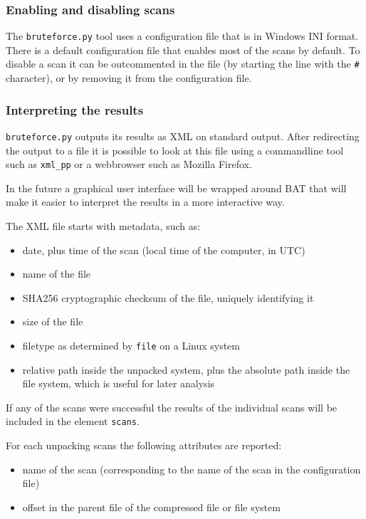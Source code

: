 \documentclass[10pt]{article}
\begin{document}
\subsubsection{Enabling and disabling scans}

The \texttt{bruteforce.py} tool uses a configuration file that is in Windows
INI format. There is a default configuration file that enables most of the
scans by default. To disable a scan it can be outcommented in the file (by
starting the line with the \texttt{\#} character), or by removing it from the
configuration file.

\subsubsection{Interpreting the results}

\texttt{bruteforce.py} outputs its results as XML on standard output. After
redirecting the output to a file it is possible to look at this file using a
commandline tool such as \texttt{xml\_pp} or a webbrowser such as Mozilla
Firefox.

In the future a graphical user interface will be wrapped around BAT that will
make it easier to interpret the results in a more interactive way.

The XML file starts with metadata, such as:

\begin{itemize}
\item date, plus time of the scan (local time of the computer, in UTC)
\item name of the file
\item SHA256 cryptographic checksum of the file, uniquely identifying it
\item size of the file
\item filetype as determined by \texttt{file} on a Linux system
\item relative path inside the unpacked system, plus the absolute path inside
the file system, which is useful for later analysis
\end{itemize}

If any of the scans were successful the results of the individual scans will
be included in the element \texttt{scans}.

For each unpacking scans the following attributes are reported:

\begin{itemize}
\item name of the scan (corresponding to the name of the scan in the
configuration file)
\item offset in the parent file of the compressed file or file system
\end{itemize}
\end{document}
